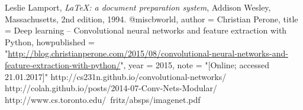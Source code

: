 \documentclass[12pt]{beamer}
\begin{document}
%
%
%
%



\begin{thebibliography}{9}
\small
{}
  Leslie Lamport,
  \emph{\LaTeX: a document preparation system},
  Addison Wesley, Massachusetts,
  2nd edition,
  1994.
@misc{bworld,
  author = {Christian Perone},
  title = {{Deep learning – Convolutional neural networks and feature extraction with Python}},
  howpublished = "\url{http://blog.christianperone.com/2015/08/convolutional-neural-networks-and-feature-extraction-with-python/}",
  year = {2015}, 
  note = "[Online; accessed 21.01.2017]"
}
http://cs231n.github.io/convolutional-networks/
http://colah.github.io/posts/2014-07-Conv-Nets-Modular/
http://www.cs.toronto.edu/~fritz/absps/imagenet.pdf
\end{thebibliography}
\end{document}
